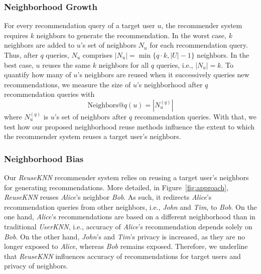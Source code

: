 \documentclass[manuscript,review,anonymous]{acmart}
\begin{document}
\subsubsection{Neighborhood Growth}
For every recommendation query of a target user $u$, the recommender system requires $k$ neighbors to generate the recommendation.
In the worst case, $k$ neighbors are added to $u$'s set of neighbors $N_u$ for each recommendation query.
Thus, after $q$ queries, $N_u$ comprises $|N_u| = \min\{ q \cdot k, |U|-1 \}$ neighbors.
In the best case, $u$ reuses the same $k$ neighbors for all $q$ queries, i.e., $|N_u| = k$.
To quantify how many of $u$'s neighbors are reused when it successively queries new recommendations, we measure the size of $u$'s neighborhood after $q$ recommendation queries with
\begin{equation}
    \mathrm{Neighbors}@q(u) = |N^{(q)}_u|
\end{equation}
where $N^{(q)}_u$ is $u$'s set of neighbors after $q$ recommendation queries.
With that, we test how our proposed neighborhood reuse methods influence the extent to which the recommender system reuses a target user's neighbors. 

\subsubsection{Neighborhood Bias}
\label{subsubsec:acc_priv_bias}
Our \emph{ReuseKNN} recommender system relies on reusing a target user's neighbors for generating recommendations.
More detailed, in Figure~\ref{fig:approach}, \emph{ReuseKNN} reuses \emph{Alice}'s neighbor \emph{Bob}.
As such, it redirects \emph{Alice}'s recommendation queries from other neighbors, i.e., \emph{John} and \emph{Tim}, to \emph{Bob}.
On the one hand, \emph{Alice}'s recommendations are based on a different neighborhood than in traditional \emph{UserKNN}, i.e., accuracy of \emph{Alice}'s recommendation depends solely on \emph{Bob}.
On the other hand, \emph{John}'s and \emph{Tim}'s privacy is increased, as they are no longer exposed to \emph{Alice}, whereas \emph{Bob} remains exposed.
Therefore, we underline that \emph{ReuseKNN} influences accuracy of recommendations for target users and privacy of neighbors.
\end{document}
